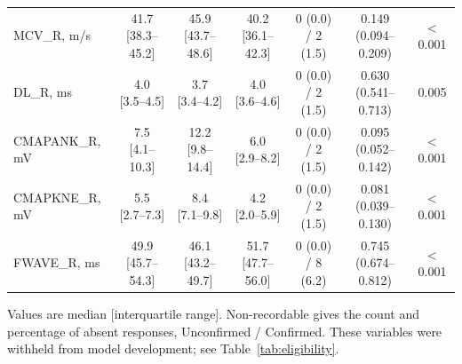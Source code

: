 \begin{table}[!ht]
\begin{tabular}{lcccccc}
MCV\_R, m/s & 41.7 [38.3--45.2] & 45.9 [43.7--48.6] & 40.2 [36.1--42.3] & 0 (0.0) / 2 (1.5) & 0.149 (0.094--0.209) & $<$0.001 \\
DL\_R, ms & 4.0 [3.5--4.5] & 3.7 [3.4--4.2] & 4.0 [3.6--4.6] & 0 (0.0) / 2 (1.5) & 0.630 (0.541--0.713) & 0.005 \\
CMAPANK\_R, mV & 7.5 [4.1--10.3] & 12.2 [9.8--14.4] & 6.0 [2.9--8.2] & 0 (0.0) / 2 (1.5) & 0.095 (0.052--0.142) & $<$0.001 \\
CMAPKNE\_R, mV & 5.5 [2.7--7.3] & 8.4 [7.1--9.8] & 4.2 [2.0--5.9] & 0 (0.0) / 2 (1.5) & 0.081 (0.039--0.130) & $<$0.001 \\
FWAVE\_R, ms & 49.9 [45.7--54.3] & 46.1 [43.2--49.7] & 51.7 [47.7--56.0] & 0 (0.0) / 8 (6.2) & 0.745 (0.674--0.812) & $<$0.001 \\
\bottomrule
\end{tabular}
\begin{flushleft}\footnotesize Values are median [interquartile range]. Non-recordable gives the count and percentage of absent responses, Unconfirmed / Confirmed. These variables were withheld from model development; see Table~\ref{tab:eligibility}.\end{flushleft}
\end{table}
